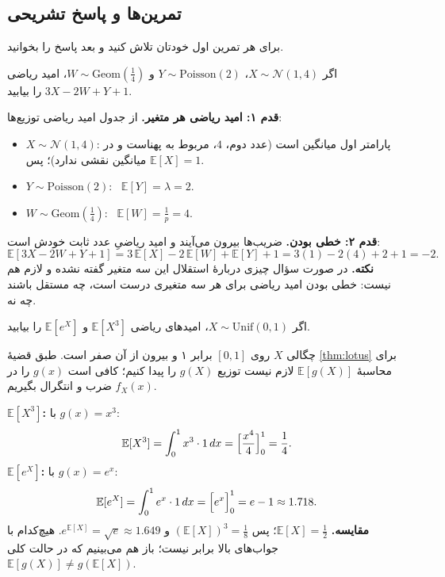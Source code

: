 \subsection*{تمرین‌ها و پاسخ تشریحی}

برای هر تمرین اول خودتان تلاش کنید و بعد پاسخ را بخوانید.

\begin{exercise}
  اگر $X\sim\mathcal N(1,4)$، $Y\sim\mathrm{Poisson}(2)$ و $W\sim\mathrm{Geom}(\tfrac14)$، امید ریاضی $3X-2W+Y+1$ را بیابید.
  \begin{solution}
    \textbf{قدم ۱: امید ریاضی هر متغیر.} از جدول امید ریاضی توزیع‌ها:
    \begin{itemize}
      \item $X\sim\mathcal N(1,4)$: پارامتر اول میانگین است (عدد دوم، $4$، مربوط به پهناست و در میانگین نقشی ندارد)؛ پس $\mathbb E[X]=1$.
      \item $Y\sim\mathrm{Poisson}(2)$: \ $\mathbb E[Y]=\lambda=2$.
      \item $W\sim\mathrm{Geom}(\tfrac14)$: \ $\mathbb E[W]=\frac1p=4$.
    \end{itemize}
    \textbf{قدم ۲: خطی بودن.} ضریب‌ها بیرون می‌آیند و امید ریاضیِ عدد ثابت خودش است:
    \[ \mathbb E[3X-2W+Y+1]=3\,\mathbb E[X]-2\,\mathbb E[W]+\mathbb E[Y]+1=3(1)-2(4)+2+1=-2. \]
    \textbf{نکته.} در صورت سؤال چیزی دربارهٔ استقلال این سه متغیر گفته نشده و لازم هم نیست: خطی بودن امید ریاضی برای هر سه متغیری درست است، چه مستقل باشند چه نه.
  \end{solution}
\end{exercise}

\begin{exercise}
  اگر $X\sim\mathrm{Unif}(0,1)$، امیدهای ریاضی $\mathbb E[X^3]$ و $\mathbb E[e^X]$ را بیابید.
  \begin{solution}
    چگالی $X$ روی $[0,1]$ برابر ۱ و بیرون از آن صفر است. طبق قضیهٔ \ref{thm:lotus} برای محاسبهٔ $\mathbb E[g(X)]$ لازم نیست توزیع $g(X)$ را پیدا کنیم؛ کافی است $g(x)$ را در $f_X(x)$ ضرب و انتگرال بگیریم.

    \textbf{$\mathbb E[X^3]$:} با $g(x)=x^3$:
    \[ \mathbb E[X^3]=\int_0^1x^3\cdot1\,dx=\Bigl[\frac{x^4}{4}\Bigr]_0^1=\frac14. \]
    \textbf{$\mathbb E[e^X]$:} با $g(x)=e^x$:
    \[ \mathbb E[e^X]=\int_0^1e^x\cdot1\,dx=\Bigl[e^x\Bigr]_0^1=e-1\approx1.718. \]
    \textbf{مقایسه.} $\mathbb E[X]=\frac12$؛ پس $(\mathbb E[X])^3=\frac18$ و $e^{\mathbb E[X]}=\sqrt e\approx1.649$. هیچ‌کدام با جواب‌های بالا برابر نیست؛ باز هم می‌بینیم که در حالت کلی $\mathbb E[g(X)]\ne g(\mathbb E[X])$.
  \end{solution}
\end{exercise}

